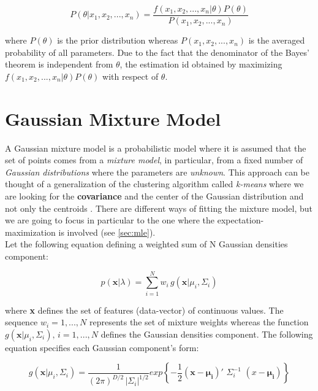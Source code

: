 \begin{equation}
	P (\theta | x_{1}, x_{2}, ... , x_{n}) = \frac{f(x_{1}, x_{2}, ... , x_{n} | \theta) P(\theta)}{P(x_{1}, x_{2}, ... , x_{n})}
\end{equation}

\noindent where $P(\theta)$ is the prior distribution whereas $P(x_{1}, x_{2}, ... , x_{n})$ is the averaged probability of all parameters. Due to the fact that the denominator of the Bayes' theorem is independent from $\theta$, the estimation id obtained by maximizing $f(x_{1}, x_{2}, ... , x_{n} | \theta) P(\theta)$ with respect of $\theta$.


\section{Gaussian Mixture Model}
A Gaussian mixture model is a probabilistic model where it is assumed that the set of points comes from a \textit{mixture model}, in particular, from a fixed number of \textit{Gaussian distributions} where the parameters are \textit{unknown}. This approach can be thought of a generalization of the clustering algorithm called \textit{k-means} where we are looking for the \textbf{covariance} and the center of the Gaussian distribution and not only the centroids \cite{sklearn_gmm}. There are different ways of fitting the mixture model, but we are going to focus in particular to the one where the expectation-maximization is involved (see \ref{sec:mle}). \\

\noindent Let the following equation defining a weighted sum of N Gaussian densities component:

\begin{equation}
	p(\textbf{x}|\lambda) = \sum_{i=1}^{N} w_{i} \, g(\textbf{x}|\mu_{i}, \Sigma_{i})
\end{equation}

\noindent where \textbf{x} defines the set of features (data-vector) of continuous values. The sequence $w_{i} = 1, ... , N$ represents the set of mixture weights whereas the function $g(\textbf{x}|\mu_{i}, \Sigma_{i}), \, i = 1, ... , N$ defines the Gaussian densities component. The following equation specifies each Gaussian component's form:

\begin{equation}
	g(\textbf{x}|\mu_{i}, \Sigma_{i}) = \frac{1}{(2\pi)^{D/2} \, |\Sigma_{i}|^{1/2}} exp \left \{ -\frac{1}{2} (\textbf{x} - \mathbf{\mu_{i}})' \,\, \Sigma_{i}^{-1} \,\, (x - \mathbf{\mu_{i}}) \right \}
\end{equation}

